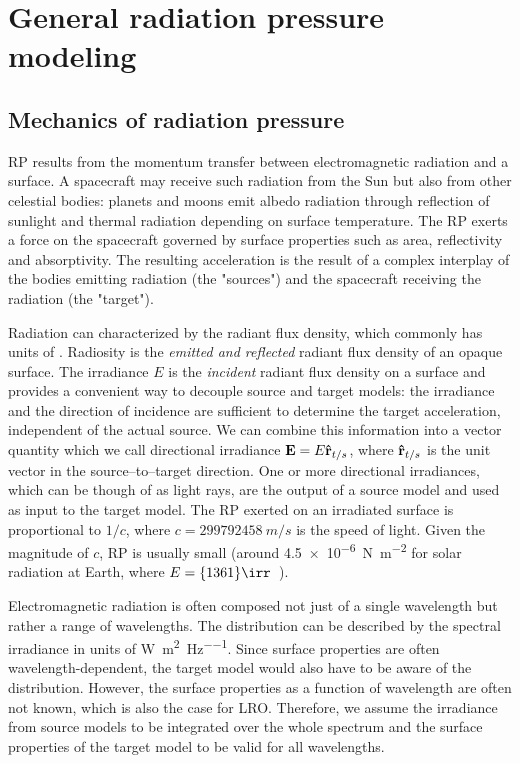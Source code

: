 \section{General radiation pressure modeling}


\subsection{Mechanics of radiation pressure}
\label{subsec:general-rp-mechanics}

\gls{RP} results from the momentum transfer between electromagnetic radiation and a surface. A spacecraft may receive such radiation from the Sun but also from other celestial bodies: planets and moons emit albedo radiation through reflection of sunlight and thermal radiation depending on surface temperature. The \gls{RP} exerts a force on the spacecraft governed by surface properties such as area, reflectivity and absorptivity. The resulting acceleration is the result of a complex interplay of the bodies emitting radiation (the "sources") and the spacecraft receiving the radiation (the "target").

Radiation can characterized by the radiant flux density, which commonly has units of \unit{\irr}. Radiosity is the \emph{emitted and reflected} radiant flux density of an opaque surface. The irradiance $E$ is the \emph{incident} radiant flux density on a surface and provides a convenient way to decouple source and target models: the irradiance and the direction of incidence are sufficient to determine the target acceleration, independent of the actual source. We can combine this information into a vector quantity which we call directional irradiance $\vb E = E \vu r_{t/s}$, where $\vu r_{t/s}$ is the unit vector in the source--to--target direction. One or more directional irradiances, which can be though of as light rays, are the output of a source model and used as input to the target model. The \gls{RP} exerted on an irradiated surface is proportional to $1/c$, where $c = \qty{299792458}{m/s}$ is the speed of light. Given the magnitude of $c$, \gls{RP} is usually small (around \qty{4.5e-6}{\N\per\m\squared} for solar radiation at Earth, where $E=\qty{1361}{\irr}$~\cite{Kopp2011}).

Electromagnetic radiation is often composed not just of a single wavelength but rather a range of wavelengths. The distribution can be described by the spectral irradiance in units of \unit{\W\per\square\m\per\Hz}. Since surface properties are often wavelength-dependent, the target model would also have to be aware of the distribution. However, the surface properties as a function of wavelength are often not known, which is also the case for \gls{LRO}. Therefore, we assume the irradiance from source models to be integrated over the whole spectrum and the surface properties of the target model to be valid for all wavelengths.




